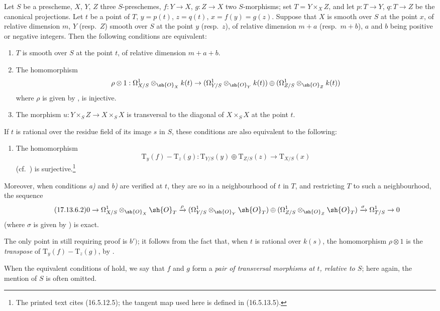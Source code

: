 \begin{corollary}[17.13.6]
\label{IV.17.13.6}
Let $S$ be a prescheme, $X$, $Y$, $Z$ three $S$-preschemes, $f:Y\to X$, $g:Z\to X$ two $S$-morphisms; set $T=Y\times_X Z$, and let $p:T\to Y$, $q:T\to Z$ be the canonical projections.
Let $t$ be a point of $T$, $y=p(t)$, $z=q(t)$, $x=f(y)=g(z)$.
Suppose that $X$ is smooth over $S$ at the point $x$, of relative dimension $m$, $Y$ (resp.\ $Z$) smooth over $S$ at the point $y$ (resp.\ $z$), of relative dimension $m+a$ (resp.\ $m+b$), $a$ and $b$ being positive or negative integers.
Then the following conditions are equivalent:
\begin{enumerate}[label=\alph*)]
  \item $T$ is smooth over $S$ at the point $t$, of relative dimension $m+a+b$.
  \item The homomorphism
  \[
    \rho\otimes 1: \Omega^1_{X/S}\otimes_{\sh{O}_X}k(t) \to (\Omega^1_{Y/S}\otimes_{\sh{O}_Y}k(t))\oplus(\Omega^1_{Z/S}\otimes_{\sh{O}_Z}k(t))
  \]
  where $\rho$ is given by , is injective.
  \item The morphism $u:Y\times_S Z\to X\times_S X$ is transversal to the diagonal of $X\times_S X$ at the point $t$.
\end{enumerate}
If $t$ is rational over the residue field of its image $s$ in $S$, these conditions are also equivalent to the following:
\begin{enumerate}
  \item[b${}'$)] The homomorphism
  \[
  \label{IV.17.13.6.1}
  \tag{17.13.6.1}
    \mathrm{T}_y(f)-\mathrm{T}_z(g): \mathrm{T}_{Y/S}(y)\oplus\mathrm{T}_{Z/S}(z) \to \mathrm{T}_{X/S}(x)
  \]
  (cf.\ ) is surjective.\footnote{The printed text cites (16.5.12.5); the tangent map used here is defined in (16.5.13.5).}
\end{enumerate}
Moreover, when conditions \emph{a)} and \emph{b)} are verified at $t$, they are so in a neighbourhood of $t$ in $T$, and restricting $T$ to such a neighbourhood, the sequence
\[
\label{IV.17.13.6.2}
\tag{17.13.6.2}
  0 \to \Omega^1_{X/S}\otimes_{\sh{O}_X}\sh{O}_T \xrightarrow{\rho} (\Omega^1_{Y/S}\otimes_{\sh{O}_Y}\sh{O}_T)\oplus(\Omega^1_{Z/S}\otimes_{\sh{O}_Z}\sh{O}_T) \xrightarrow{\sigma} \Omega^1_{T/S} \to 0
\]
(where $\sigma$ is given by ) is exact.

The only point in  still requiring proof is $b')$; it follows from the fact that, when $t$ is rational over $k(s)$, the homomorphism $\rho\otimes1$ is the \emph{transpose} of $\mathrm{T}_y(f)-\mathrm{T}_z(g)$, by .

When the equivalent conditions of  hold, we say that $f$ and $g$ form a \emph{pair of transversal morphisms at $t$, relative to $S$}; here again, the mention of $S$ is often omitted.
\end{corollary}

